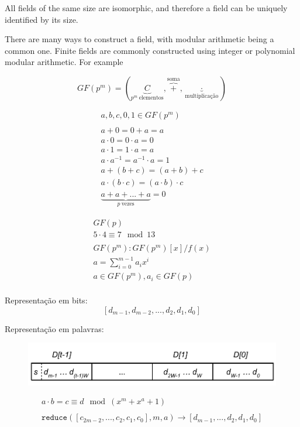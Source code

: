 All fields of the same size are isomorphic, and therefore a field can be uniquely identified by its size.

There are many ways to construct a field, with modular arithmetic being a common one.
Finite fields are commonly constructed using integer or polynomial modular arithmetic. For example

$$GF(p^m) = (\underbrace{C}_{p^m~\text{elementos}}, \overbrace{+}^{\text{soma}}, \underbrace{\cdot}_{\text{multiplicação}})$$

\begin{gather*}
a, b, c, 0, 1 \in GF(p^m) \\
\\
a + 0 = 0 + a = a \\
a \cdot 0 = 0 \cdot a = 0 \\
a \cdot 1 = 1 \cdot a = a \\
a \cdot a^{-1} = a^{-1} \cdot a = 1 \\
a + (b + c) = (a + b) + c \\
a \cdot (b \cdot c) = (a \cdot b) \cdot c \\
\underbrace{a + a + ... + a}_{p~\text{vezes}} = 0
\end{gather*}

\begin{gather*}
GF(p)\\
5 \cdot 4 \equiv 7 \mod 13 \\
\\
GF(p^m): GF(p^m)[x]/f(x)\\
a = \sum_{i=0}^{m-1} a_i x^i \\
a \in GF(p^m), a_i \in GF(p) \\
\end{gather*}


Representação em bits:
$$[d_{m-1}, d_{m-2}, ..., d_2, d_1, d_0]$$

Representação em palavras:

\begin{figure}[htb]
  \centering
  \includegraphics[width = .55\columnwidth]{figures/element-word.pdf}
\end{figure}

\begin{gather*}
a \cdot b = c \equiv d \mod (x^m + x^a + 1) \\
\\
\texttt{reduce}([c_{2m-2}, ..., c_2, c_1, c_0], m, a) \rightarrow [d_{m-1}, ..., d_2, d_1, d_0]
\end{gather*}

